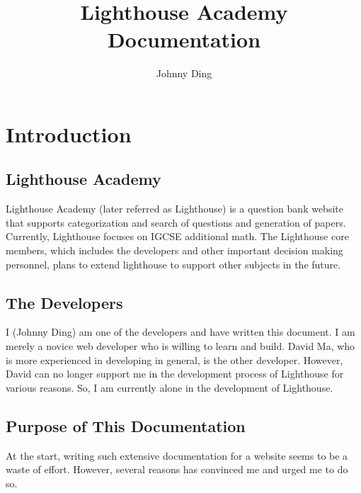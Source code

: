 \documentclass{article}
\begin{document}
\title{Lighthouse Academy Documentation}
\author{Johnny Ding}
\maketitle
\newpage

\tableofcontents
\newpage
{}


\section{Introduction}


\subsection{Lighthouse Academy}

Lighthouse Academy (later referred as Lighthouse) is a question bank website that supports categorization and search of questions and generation of papers. Currently, Lighthouse focuses on IGCSE additional math. The Lighthouse core members, which includes the developers and other important decision making personnel, plans to extend lighthouse to support other subjects in the future.

\subsection{The Developers}

I (Johnny Ding) am one of the developers and have written this document. I am merely a novice web developer who is willing to learn and build. David Ma, who is more experienced in developing in general, is the other developer. However, David can no longer support me in the development process of Lighthouse for various reasons. So, I am currently alone in the development of Lighthouse.

\subsection{Purpose of This Documentation}

At the start, writing such extensive documentation for a website seems to be a waste of effort. However, several reasons has convinced me and urged me to do so.
\end{document}
